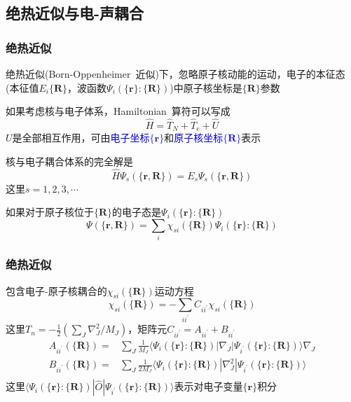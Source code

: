\subsection{绝热近似与电-声耦合}
\frame
{
	\frametitle{绝热近似}
	绝热近似(\textrm{Born-Oppenheimer~}近似)下，忽略原子核动能的运动，电子的本征态(本征值$E_i\{\mathbf{R}\}$，波函数$\Psi_i(\{\mathbf{r}\}:\{\mathbf{R}\})$)中原子核坐标是$\{\mathbf{R}\}$参数

	如果考虑核与电子体系，\textrm{Hamiltonian~}算符可以写成
	\begin{displaymath}
		\hat H=\hat T_N+\hat T_e+\hat U
	\end{displaymath}
	$U$是全部相互作用，可由\textcolor{blue}{电子坐标$\{\mathbf{r}\}$}和\textcolor{blue}{原子核坐标$\{\mathbf{R}\}$}表示

	核与电子耦合体系的完全解是
	\begin{displaymath}
		\hat H\Psi_s(\{\mathbf{r},\mathbf{R}\})=E_s\Psi_s(\{\mathbf{r},\mathbf{R}\})
	\end{displaymath}
	这里$s=1,2,3,\cdots$

	如果对于原子核位于$\{\mathbf{R}\}$的电子态是$\Psi_i(\{\mathbf{r}\}:\{\mathbf{R}\})$
	\begin{displaymath}
		\Psi(\{\mathbf{r},\mathbf{R}\})=\sum_i\chi_{si}(\{\mathbf{R}\})\Psi_i(\{\mathbf{r}\}:\{\mathbf{R}\})
	\end{displaymath}
}

\frame
{
	\frametitle{绝热近似}
	包含电子-原子核耦合的$\chi_{si}(\{\mathbf{R}\})$运动方程
	\begin{displaymath}
		[T_N+E_i(\{\mathbf{R}\})-E_s]\chi_{si}(\{\mathbf{R}\})=-\sum_{ii^{\prime}}C_{ii^{\prime}}\chi_{si}(\{\mathbf{R}\})
	\end{displaymath}
	这里$T_n=-\frac12(\sum\limits_J\nabla_J^2/M_J)$，矩阵元$C_{ii^{\prime}}=A_{ii^{\prime}}+B_{ii^{\prime}}$
	\begin{displaymath}
		\begin{aligned}
			A_{ii^{\prime}}(\{\mathbf{R}\})=&\sum_J\frac1{M_J}\langle\Psi_i(\{\mathbf{r}\}:\{\mathbf{R}\})|\nabla_J|\Psi_{i^{\prime}}(\{\mathbf{r}\}:\{\mathbf{R}\})\rangle\nabla_J\\
			B_{ii^{\prime}}(\{\mathbf{R}\})=&\sum_J\frac1{2M_J}\langle\Psi_i(\{\mathbf{r}\}:\{\mathbf{R}\})|\nabla_J^2|\Psi_{i^{\prime}}(\{\mathbf{r}\}:\{\mathbf{R}\})\rangle\\
		\end{aligned}
	\end{displaymath}
	这里$\langle\Psi_i(\{\mathbf{r}\}:\{\mathbf{R}\})|\hat O|\Psi_{i^{\prime}}(\{\mathbf{r}\}:\{\mathbf{R}\})\rangle$表示对电子变量$\{\mathbf{r}\}$积分
}

